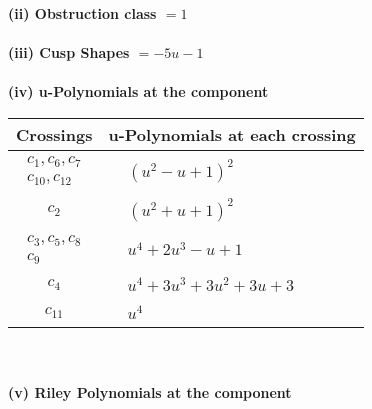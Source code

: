 \documentclass[1p]{elsarticle_modified}
\theoremstyle{definition}
\begin{document}
\flushleft \textbf{(ii) Obstruction class $= 1$}\\~\\
\flushleft \textbf{(iii) Cusp Shapes $= -5 u-1$}\\~\\
\newpage\renewcommand{\arraystretch}{1}
\flushleft \textbf{(iv) u-Polynomials at the component}\newline \\
\begin{tabular}{m{50pt}|m{274pt}}
Crossings & \hspace{64pt}u-Polynomials at each crossing \\
\hline $$\begin{aligned}c_{1},c_{6},c_{7}\\c_{10},c_{12}\end{aligned}$$&$\begin{aligned}
&(u^2- u+1)^2
\end{aligned}$\\
\hline $$\begin{aligned}c_{2}\end{aligned}$$&$\begin{aligned}
&(u^2+u+1)^2
\end{aligned}$\\
\hline $$\begin{aligned}c_{3},c_{5},c_{8}\\c_{9}\end{aligned}$$&$\begin{aligned}
&u^4+2 u^3- u+1
\end{aligned}$\\
\hline $$\begin{aligned}c_{4}\end{aligned}$$&$\begin{aligned}
&u^4+3 u^3+3 u^2+3 u+3
\end{aligned}$\\
\hline $$\begin{aligned}c_{11}\end{aligned}$$&$\begin{aligned}
&u^4
\end{aligned}$\\
\hline
\end{tabular}\\~\\
\newpage\renewcommand{\arraystretch}{1}
\flushleft \textbf{(v) Riley Polynomials at the component}\newline \\
\end{document}
